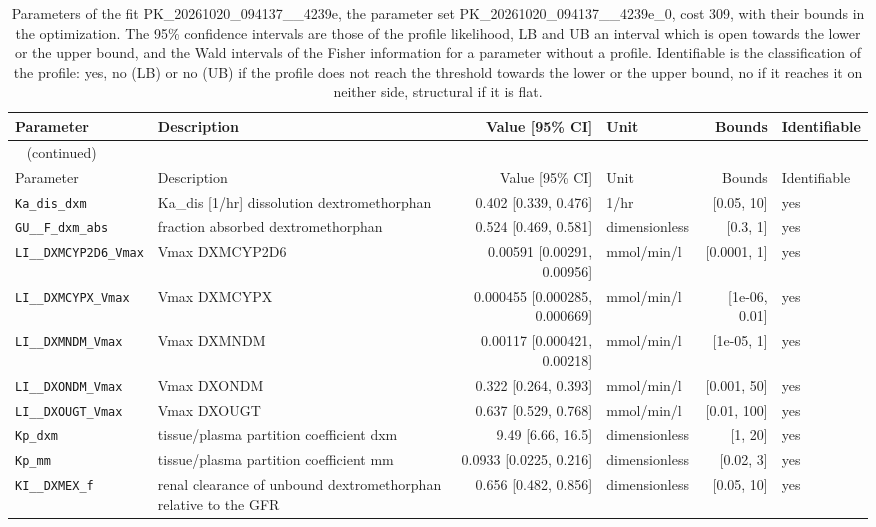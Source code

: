 \documentclass{article}
\begin{document}
\begin{longtable}{llrlrl}
\caption{Parameters of the fit PK\_20261020\_094137\_\_4239e, the parameter set PK\_20261020\_094137\_\_4239e\_0, cost 309, with their bounds in the optimization. The 95\% confidence intervals are those of the profile likelihood, LB and UB an interval which is open towards the lower or the upper bound, and the Wald intervals of the Fisher information for a parameter without a profile. Identifiable is the classification of the profile: yes, no (LB) or no (UB) if the profile does not reach the threshold towards the lower or the upper bound, no if it reaches it on neither side, structural if it is flat.}\label{tab:parameters:PK_20261020_094137__4239e} \\
\toprule
Parameter & Description & Value [95\% CI] & Unit & Bounds & Identifiable \\
\midrule
\endfirsthead
\multicolumn{6}{l}{\small\tablename~\thetable{} (continued)} \\
\toprule
Parameter & Description & Value [95\% CI] & Unit & Bounds & Identifiable \\
\midrule
\endhead
\bottomrule
\endlastfoot
\texttt{Ka\_dis\_dxm} & Ka\_dis [1/hr] dissolution dextromethorphan & 0.402 [0.339, 0.476] & 1/hr & [0.05, 10] & yes \\
\texttt{GU\_\_F\_dxm\_abs} & fraction absorbed dextromethorphan & 0.524 [0.469, 0.581] & dimensionless & [0.3, 1] & yes \\
\texttt{LI\_\_DXMCYP2D6\_Vmax} & Vmax DXMCYP2D6 & 0.00591 [0.00291, 0.00956] & mmol/min/l & [0.0001, 1] & yes \\
\texttt{LI\_\_DXMCYPX\_Vmax} & Vmax DXMCYPX & 0.000455 [0.000285, 0.000669] & mmol/min/l & [1e-06, 0.01] & yes \\
\texttt{LI\_\_DXMNDM\_Vmax} & Vmax DXMNDM & 0.00117 [0.000421, 0.00218] & mmol/min/l & [1e-05, 1] & yes \\
\texttt{LI\_\_DXONDM\_Vmax} & Vmax DXONDM & 0.322 [0.264, 0.393] & mmol/min/l & [0.001, 50] & yes \\
\texttt{LI\_\_DXOUGT\_Vmax} & Vmax DXOUGT & 0.637 [0.529, 0.768] & mmol/min/l & [0.01, 100] & yes \\
\texttt{Kp\_dxm} & tissue/plasma partition coefficient dxm & 9.49 [6.66, 16.5] & dimensionless & [1, 20] & yes \\
\texttt{Kp\_mm} & tissue/plasma partition coefficient mm & 0.0933 [0.0225, 0.216] & dimensionless & [0.02, 3] & yes \\
\texttt{KI\_\_DXMEX\_f} & renal clearance of unbound dextromethorphan relative to the GFR & 0.656 [0.482, 0.856] & dimensionless & [0.05, 10] & yes \\

\end{longtable}
\end{document}
